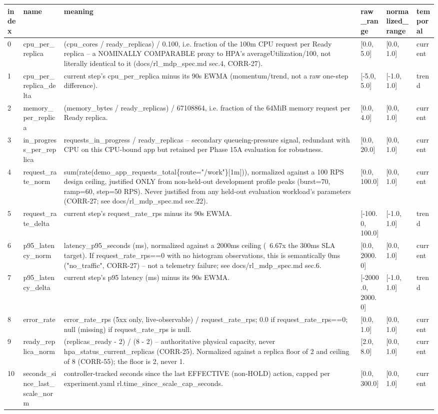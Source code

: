 \begin{tabular}{p{0.6cm}p{2.6cm}p{6.2cm}p{1.6cm}p{1.7cm}p{1.3cm}}
\hline
index & name & meaning & raw\_range & normalized\_range & temporal \\
\hline
0 & cpu\_per\_replica & (cpu\_cores / ready\_replicas) / 0.100, i.e. fraction of the 100m CPU request per Ready replica -- a NOMINALLY COMPARABLE proxy to HPA's averageUtilization/100, not literally identical to it (docs/rl\_mdp\_spec.md sec.4, CORR-27). & [0.0, 5.0] & [0.0, 1.0] & current \\
1 & cpu\_per\_replica\_delta & current step's cpu\_per\_replica minus its 90s EWMA (momentum/trend, not a raw one-step difference). & [-5.0, 5.0] & [-1.0, 1.0] & trend \\
2 & memory\_per\_replica & (memory\_bytes / ready\_replicas) / 67108864, i.e. fraction of the 64MiB memory request per Ready replica. & [0.0, 4.0] & [0.0, 1.0] & current \\
3 & in\_progress\_per\_replica & requests\_in\_progress / ready\_replicas -- secondary queueing-pressure signal, redundant with CPU on this CPU-bound app but retained per Phase 15A evaluation for robustness. & [0.0, 20.0] & [0.0, 1.0] & current \\
4 & request\_rate\_norm & sum(\allowbreak rate(\allowbreak demo\_app\_requests\_total\allowbreak \{route="/work"\}[1m])), normalized against a 100 RPS design ceiling, justified ONLY from non-held-out development profile peaks (burst=70, ramp=60, step=50 RPS). Never justified from any held-out evaluation workload's parameters (CORR-27; see docs/rl\_mdp\_spec.md sec.22). & [0.0, 100.0] & [0.0, 1.0] & current \\
5 & request\_rate\_delta & current step's request\_rate\_rps minus its 90s EWMA. & [-100.0, 100.0] & [-1.0, 1.0] & trend \\
6 & p95\_latency\_norm & latency\_p95\_seconds (ms), normalized against a 2000ms ceiling (~6.67x the 300ms SLA target). If request\_rate\_rps==0 with no histogram observations, this is semantically 0ms ("no\_traffic", CORR-27) -- not a telemetry failure; see docs/rl\_mdp\_spec.md sec.6. & [0.0, 2000.0] & [0.0, 1.0] & current \\
7 & p95\_latency\_delta & current step's p95 latency (ms) minus its 90s EWMA. & [-2000.0, 2000.0] & [-1.0, 1.0] & trend \\
8 & error\_rate & error\_rate\_rps (5xx only, live-observable) / request\_rate\_rps; 0.0 if request\_rate\_rps==0; null (missing) if request\_rate\_rps is null. & [0.0, 1.0] & [0.0, 1.0] & current \\
9 & ready\_replica\_norm & (replicas\_ready - 2) / (8 - 2) -- authoritative physical capacity, never hpa\_status\_current\_replicas (CORR-25). Normalized against a replica floor of 2 and ceiling of 8 (CORR-55); the floor is 2, never 1. & [2.0, 8.0] & [0.0, 1.0] & current \\
10 & seconds\_since\_last\_scale\_norm & controller-tracked seconds since the last EFFECTIVE (non-HOLD) action, capped per experiment.yaml rl.time\_since\_scale\_cap\_seconds. & [0.0, 300.0] & [0.0, 1.0] & current \\
\hline
\end{tabular}
